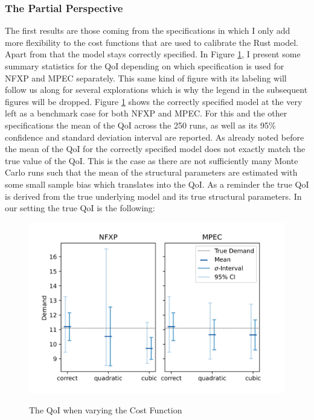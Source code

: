 \subsubsection{The Partial Perspective} \label{partial}

The first results are those coming from the specifications in which I only add more flexibility to the cost functions that are used to calibrate the Rust model. Apart from that the model stays correctly specified. In Figure \ref{figure5}, I present some summary statistics for the QoI depending on which specification is used for NFXP and MPEC separately. This same kind of figure with its labeling will follow us along for several explorations which is why the legend in the subsequent figures will be dropped. Figure \ref{figure5} shows the correctly specified model at the very left as a benchmark case for both NFXP and MPEC. For this and the other specifications the mean of the QoI across the 250 runs, as well as its 95\% confidence and standard deviation interval are reported. As already noted before the mean of the QoI for the correctly specified model does not exactly match the true value of the QoI. This is the case as there are not sufficiently many Monte Carlo runs such that the mean of the structural parameters are estimated with some small sample bias which translates into the QoI. As a reminder the true QoI is derived from the true underlying model and its true structural parameters. In our setting the true QoI is the following:

\begin{figure}[!t]
	\caption{The QoI when varying the Cost Function}
	\vspace*{-4mm}
	\centering
	\includegraphics[scale=0.9]{../figures/figure_5.png}
	\label{figure5}
\end{figure}

